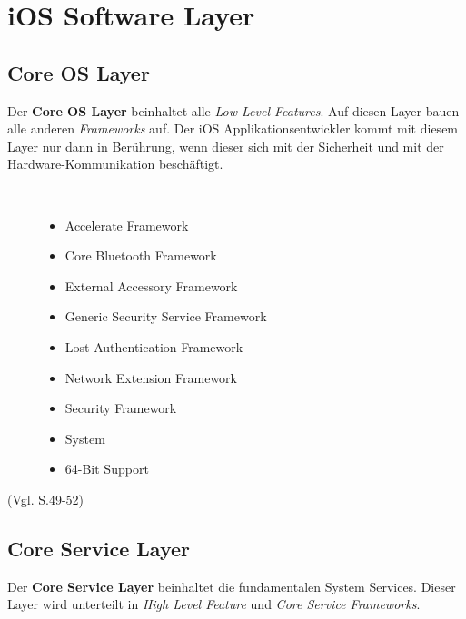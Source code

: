 \section{iOS Software Layer}
\label{sec:iOSSWLayer}

\subsection{Core OS Layer}
\label{sec:CoreLayer}

Der \textbf{Core OS Layer} beinhaltet alle \textit{\glqq Low Level Features\grqq}. Auf diesen Layer bauen alle anderen \textit{\glqq Frameworks\grqq{}} auf. Der iOS Applikationsentwickler kommt mit diesem Layer nur dann in Berührung, wenn dieser sich mit der Sicherheit und mit der Hardware-Kommunikation beschäftigt. 
\begin{description}
	\item[\parbox{\textwidth} {Das Core OS Layer Framework beinhaltet folgende Frameworks}]~\par
	\begin{itemize}
		\item Accelerate Framework
		\item Core Bluetooth Framework
		\item External Accessory Framework
		\item Generic Security Service Framework
		\item Lost Authentication Framework
		\item Network Extension Framework
		\item Security Framework
		\item System
		\item 64-Bit Support
	\end{itemize}
\end{description}
 (Vgl. \cite{Apple[6]} S.49-52) 
 
\subsection{Core Service Layer}
\label{sec:CoreServiceLayer}		
Der \textbf{Core Service Layer} beinhaltet die fundamentalen System Services. Dieser Layer wird unterteilt in \textit{\glqq High Level Feature\grqq{}} und \textit{\glqq Core Service Frameworks\grqq{}}.

